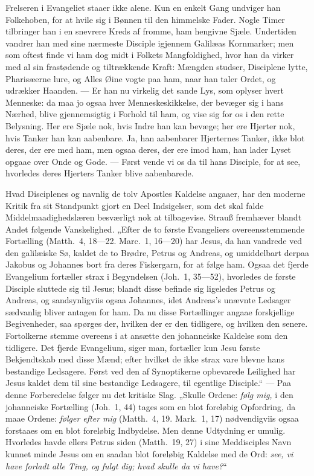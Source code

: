 \documentclass[12pt,a4paper]{book}
\begin{document}
Frelseren i Evangeliet staaer ikke alene. Kun en enkelt Gang undviger han
Folkehoben, for at hvile sig i Bønnen til den himmelske Fader. Nogle Timer
tilbringer han i en snevrere Kreds af fromme, ham hengivne Sjæle. Undertiden
vandrer han med sine nærmeste Disciple igjennem Galilæas Kornmarker; men som
oftest finde vi ham dog midt i Folkets Mangfoldighed, hvor han da virker med al
sin frastødende og tiltrækkende Kraft: Mængden studser, Disciplene lytte,
Pharisæerne lure, og Alles Øine vogte paa ham, naar han taler Ordet, og udrækker
Haanden. --- Er han nu virkelig det sande Lys, som oplyser hvert Menneske: da
maa jo ogsaa hver Menneskeskikkelse, der bevæger sig i hans Nærhed, blive
gjennemsigtig i Forhold til ham, og vise sig for os i den rette Belysning. Her
ere Sjæle nok, hvis Indre han kan bevæge; her ere Hjerter nok, hvis Tanker han
kan aabenbare. Ja, han aabenbarer Hjerternes Tanker, ikke blot deres, der ere
med ham, men ogsaa deres, der ere imod ham, han lader Lyset opgaae over Onde og
Gode. --- Først vende vi os da til hans Disciple, for at see, hvorledes deres
Hjerters Tanker blive aabenbarede.

Hvad Disciplenes og navnlig de tolv Apostles Kaldelse angaaer, har den moderne
Kritik fra sit Standpunkt gjort en Deel Indsigelser, som det skal falde
Middelmaadighedslæren besværligt nok at tilbagevise. Strauß fremhæver blandt
Andet følgende Vanskelighed. „Efter de to første Evangeliers overeensstemmende
Fortælling (Matth.\ 4, 18---22. Marc.\ 1, 16---20) har Jesus, da han vandrede ved
den galilæiske Sø, kaldet de to Brødre, Petrus og Andreas, og umiddelbart derpaa
Jakobus og Johannes bort fra deres Fiskergarn, for at følge ham. Ogsaa det fjerde
Evangelium fortæller strax i Begyndelsen (Joh.\ 1, 35---52), hvorledes de første
Disciple sluttede sig til Jesus; blandt disse befinde sig ligeledes Petrus og
Andreas, og sandsynligviis ogsaa Johannes, idet Andreas's unævnte Ledsager
sædvanlig bliver antagen for ham. Da nu disse Fortællinger angaae forskjellige
Begivenheder, saa spørges der, hvilken der er den tidligere, og hvilken den
senere. Fortolkerne stemme overeens i at ansætte den johanneiske Kaldelse som den
tidligere. Det fjerde Evangelium, siger man, fortæller kun Jesu første
Bekjendtskab med disse Mænd; efter hvilket de ikke strax vare blevne hans
bestandige Ledsagere. Først ved den af Synoptikerne opbevarede Leilighed har
Jesus kaldet dem til sine bestandige Ledsagere, til egentlige Disciple.“ --- Paa
denne Forberedelse følger nu det kritiske Slag. „Skulle Ordene: \emph{følg mig,}
i den johanneiske Fortælling (Joh.\ 1, 44) tages som en blot foreløbig
Opfordring, da maae Ordene: \emph{følger efter mig} (Matth.\ 4, 19. Mark.\ 1, 17)
nødvendigviis ogsaa forstaaes om en blot foreløbig Indbydelse. Men denne
Udtydning er umulig. Hvorledes havde ellers Petrus siden (Matth.\ 19, 27) i sine
Meddisciples Navn kunnet minde Jesus om en saadan blot foreløbig Kaldelse med de
Ord: \emph{see, vi have forladt alle Ting, og fulgt dig; hvad skulle da vi
have?}“
\end{document}
